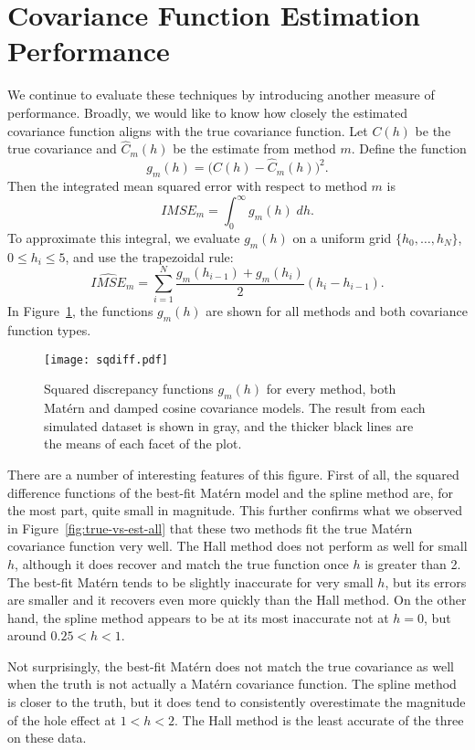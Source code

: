 \section{Covariance Function Estimation Performance} %
\label{sec:covariance_function_estimation_performance}

We continue to evaluate these techniques by introducing another measure of performance. Broadly, we would like to know how closely the estimated covariance function aligns with the true covariance function. Let $C(h)$ be the true covariance and $\widehat{C}_m(h)$ be the estimate from method $m$. Define the function
\[
	g_m(h) = \big(C(h) - \widehat{C}_m(h) \big)^2.
\]
Then the integrated mean squared error with respect to method $m$ is
\[
	IMSE_m = \int_0^\infty g_m(h) \; dh.
\]
To approximate this integral, we evaluate $g_m(h)$ on a uniform grid $\{h_0, \dots, h_N\}$, $0 \leq h_i \leq 5$, and use the trapezoidal rule:
\[
	\widehat{IMSE}_m = \sum_{i=1}^N \frac{g_m(h_{i-1}) + g_m(h_i)}{2} (h_i - h_{i-1}).
\]
In Figure~\ref{fig:sqdiff}, the functions $g_m(h)$ are shown for all methods and both covariance function types.

\begin{figure}[htbp]
	\centering
	\texttt{[image: sqdiff.pdf]}
	\caption{Squared discrepancy functions $g_m(h)$ for every method, both Mat\'{e}rn and damped cosine covariance models. The result from each simulated dataset is shown in gray, and the thicker black lines are the means of each facet of the plot.}
	\label{fig:sqdiff}
\end{figure}

There are a number of interesting features of this figure. First of all, the squared difference functions of the best-fit Mat\'{e}rn model and the spline method are, for the most part, quite small in magnitude. This further confirms what we observed in Figure~\ref{fig:true-vs-est-all} that these two methods fit the true Mat\'{e}rn covariance function very well. The Hall method does not perform as well for small $h$, although it does recover and match the true function once $h$ is greater than 2. The best-fit Mat\'{e}rn tends to be slightly inaccurate for very small $h$, but its errors are smaller and it recovers even more quickly than the Hall method. On the other hand, the spline method appears to be at its most inaccurate not at $h = 0$, but around $0.25 < h < 1$.

Not surprisingly, the best-fit Mat\'{e}rn does not match the true covariance as well when the truth is not actually a Mat\'{e}rn covariance function. The spline method is closer to the truth, but it does tend to consistently overestimate the magnitude of the hole effect at $1 < h < 2$. The Hall method is the least accurate of the three on these data.

